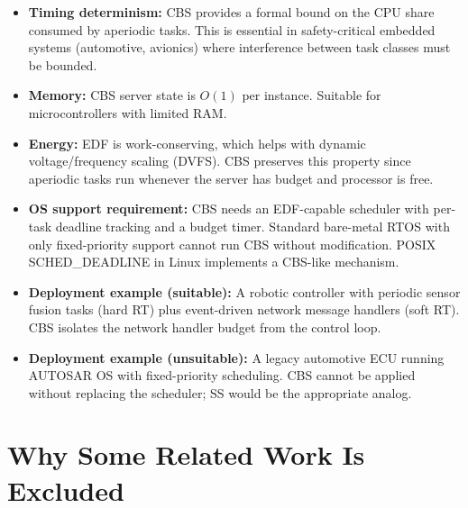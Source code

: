 \documentclass[conference]{IEEEtran}
\begin{document}
\begin{itemize}
  \item \textbf{Timing determinism:} CBS provides a formal bound on
        the CPU share consumed by aperiodic tasks. This is essential in
        safety-critical embedded systems (automotive, avionics) where
        interference between task classes must be bounded.
  \item \textbf{Memory:} CBS server state is $O(1)$ per instance.
        Suitable for microcontrollers with limited RAM.
  \item \textbf{Energy:} EDF is work-conserving, which helps with
        dynamic voltage/frequency scaling (DVFS). CBS preserves this
        property since aperiodic tasks run whenever the server has
        budget and processor is free.
  \item \textbf{OS support requirement:} CBS needs an EDF-capable
        scheduler with per-task deadline tracking and a budget timer.
        Standard bare-metal RTOS with only fixed-priority support cannot
        run CBS without modification. POSIX SCHED\_DEADLINE in Linux
        implements a CBS-like mechanism.
  \item \textbf{Deployment example (suitable):} A robotic controller
        with periodic sensor fusion tasks (hard RT) plus event-driven
        network message handlers (soft RT). CBS isolates the network
        handler budget from the control loop.
  \item \textbf{Deployment example (unsuitable):} A legacy automotive
        ECU running AUTOSAR OS with fixed-priority scheduling. CBS
        cannot be applied without replacing the scheduler; SS would be
        the appropriate analog.
\end{itemize}

\section{Why Some Related Work Is Excluded}
\end{document}
